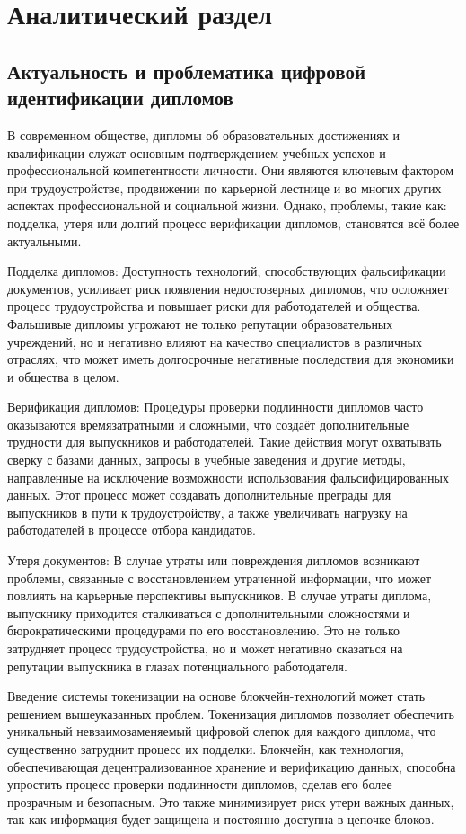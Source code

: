 \section{Аналитический раздел}
\label{sec:analytics}

\subsection{Актуальность и проблематика цифровой идентификации дипломов}

В современном обществе, дипломы об образовательных достижениях и квалификации служат основным подтверждением учебных успехов и профессиональной компетентности личности. Они являются ключевым фактором при трудоустройстве, продвижении по карьерной лестнице и во многих других аспектах профессиональной и социальной жизни. Однако, проблемы, такие как: подделка, утеря или долгий процесс верификации дипломов, становятся всё более актуальными.

Подделка дипломов: Доступность технологий, способствующих фальсификации документов, усиливает риск появления недостоверных дипломов, что осложняет процесс трудоустройства и повышает риски для работодателей и общества. Фальшивые дипломы угрожают не только репутации образовательных учреждений, но и негативно влияют на качество специалистов в различных отраслях, что может иметь долгосрочные негативные последствия для экономики и общества в целом.

Верификация дипломов: Процедуры проверки подлинности дипломов часто оказываются времязатратными и сложными, что создаёт дополнительные трудности для выпускников и работодателей. Такие действия могут охватывать сверку с базами данных, запросы в учебные заведения и другие методы, направленные на исключение возможности использования фальсифицированных данных. Этот процесс может создавать дополнительные преграды для выпускников в пути к трудоустройству, а также увеличивать нагрузку на работодателей в процессе отбора кандидатов.

Утеря документов: В случае утраты или повреждения дипломов возникают проблемы, связанные с восстановлением утраченной информации, что может повлиять на карьерные перспективы выпускников.  В случае утраты диплома, выпускнику приходится сталкиваться с дополнительными сложностями и бюрократическими процедурами по его восстановлению. Это не только затрудняет процесс трудоустройства, но и может негативно сказаться на репутации выпускника в глазах потенциального работодателя.

Введение системы токенизации на основе блокчейн-технологий может стать решением вышеуказанных проблем. Токенизация дипломов позволяет обеспечить уникальный невзаимозаменяемый цифровой слепок для каждого диплома, что существенно затруднит процесс их подделки. Блокчейн, как технология, обеспечивающая децентрализованное хранение и верификацию данных, способна упростить процесс проверки подлинности дипломов, сделав его более прозрачным и безопасным. Это также минимизирует риск утери важных данных, так как информация будет защищена и постоянно доступна в цепочке блоков.

